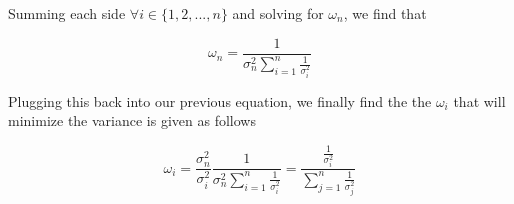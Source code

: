 \documentclass[12pt]{article}
\begin{document}
Summing each side $\forall i \in \{1, 2, ..., n\}$ and solving for $\omega_{n}$, we find that

		\[  \omega_{n} = \frac{1}{\sigma_{n}^2 \sum_{i=1}^{n} \frac{1}{\sigma_{i}^2}}	\]

Plugging this back into our previous equation, we finally find the the $\omega_{i}$ that will minimize the variance is given as follows

		\[  \omega_{i} = \frac{\sigma_{n}^2}{\sigma_{i}^2} \frac{1}{\sigma_{n}^2 \sum_{i=1}^{n} \frac{1}{\sigma_{i}^2}} = 
		\frac{\frac{1}{\sigma_{i}^2}}{\sum_{j=1}^{n	}\frac{1}{\sigma_{j}^2}} \]
\end{document}
